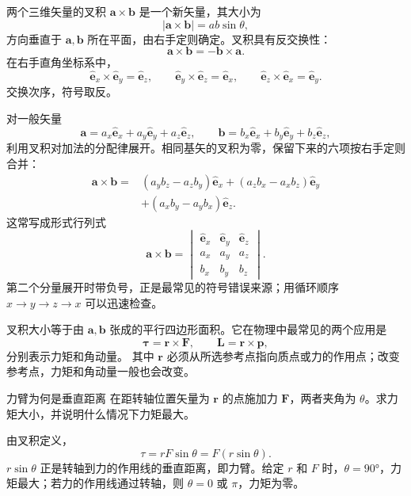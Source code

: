 \documentclass[UTF8,zihao=-4,oneside,openany]{ctexbook}
\numberwithin{equation}{section}
\newcommand{\vect}[1]{\bm{#1}}
\newcommand{\uvec}[1]{\hat{\vect{#1}}}
\begin{document}
两个三维矢量的叉积 $\vect a\times\vect b$ 是一个新矢量，其大小为
\begin{equation}
  \lvert\vect a\times\vect b\rvert=ab\sin\theta,
  \label{eq:cross-product-magnitude}
\end{equation}
方向垂直于 $\vect a,\vect b$ 所在平面，由右手定则确定。叉积具有反交换性：
\[
  \vect a\times\vect b=-\vect b\times\vect a.
\]
在右手直角坐标系中，
\[
  \uvec e_x\times\uvec e_y=\uvec e_z,\qquad
  \uvec e_y\times\uvec e_z=\uvec e_x,\qquad
  \uvec e_z\times\uvec e_x=\uvec e_y.
\]
交换次序，符号取反。

对一般矢量
\[
  \vect a=a_x\uvec e_x+a_y\uvec e_y+a_z\uvec e_z,\qquad
  \vect b=b_x\uvec e_x+b_y\uvec e_y+b_z\uvec e_z,
\]
利用叉积对加法的分配律展开。相同基矢的叉积为零，保留下来的六项按右手定则合并：
\begin{align*}
  \vect a\times\vect b
  ={}&(a_yb_z-a_zb_y)\uvec e_x
   +(a_zb_x-a_xb_z)\uvec e_y\\
   &+(a_xb_y-a_yb_x)\uvec e_z.
\end{align*}
这常写成形式行列式
\begin{equation}
  \vect a\times\vect b=
  \begin{vmatrix}
    \uvec e_x&\uvec e_y&\uvec e_z\\
    a_x&a_y&a_z\\
    b_x&b_y&b_z
  \end{vmatrix}.
  \label{eq:cross-product-components}
\end{equation}
第二个分量展开时带负号，正是最常见的符号错误来源；用循环顺序
$x\to y\to z\to x$ 可以迅速检查。

叉积大小等于由 $\vect a,\vect b$ 张成的平行四边形面积。它在物理中最常见的两个应用是
\begin{equation}
  \vect\tau=\vect r\times\vect F,
  \qquad
  \vect L=\vect r\times\vect p,
  \label{eq:torque-angular-momentum}
\end{equation}
分别表示力矩和角动量。
其中 $\vect r$ 必须从所选参考点指向质点或力的作用点；改变参考点，力矩和角动量一般也会改变。

\begin{examplebox}{力臂为何是垂直距离}
在距转轴位置矢量为 $\vect r$ 的点施加力 $\vect F$，两者夹角为 $\theta$。求力矩大小，并说明什么情况下力矩最大。

\tcblower
由叉积定义，
\[
  \tau=rF\sin\theta=F(r\sin\theta).
\]
$r\sin\theta$ 正是转轴到力的作用线的垂直距离，即力臂。给定 $r$ 和 $F$ 时，$\theta=\ang{90}$，力矩最大；若力的作用线通过转轴，则 $\theta=0$ 或 $\pi$，力矩为零。
\end{examplebox}
\end{document}
